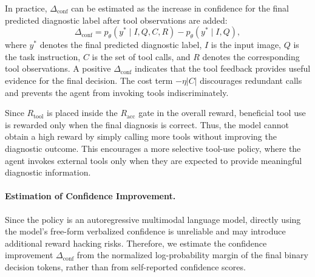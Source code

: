 \documentclass{article}
\begin{document}
{In practice, $\Delta_{\text{conf}}$ can be estimated as the increase in confidence for the final predicted diagnostic label after tool observations are added:
\begin{equation}
\Delta_{\text{conf}}
=
p_{\theta}(y^{*} \mid I, Q, C, R)
-
p_{\theta}(y^{*} \mid I, Q),
\end{equation}
where $y^{*}$ denotes the final predicted diagnostic label, $I$ is the input image, $Q$ is the task instruction, $C$ is the set of tool calls, and $R$ denotes the corresponding tool observations. 
A positive $\Delta_{\text{conf}}$ indicates that the tool feedback provides useful evidence for the final decision. 
The cost term $-\eta |C|$ discourages redundant calls and prevents the agent from invoking tools indiscriminately.

Since $R_{\text{tool}}$ is placed inside the $R_{\text{acc}}$ gate in the overall reward, beneficial tool use is rewarded only when the final diagnosis is correct. 
Thus, the model cannot obtain a high reward by simply calling more tools without improving the diagnostic outcome. 
This encourages a more selective tool-use policy, where the agent invokes external tools only when they are expected to provide meaningful diagnostic information.

\paragraph{Estimation of Confidence Improvement.}
Since the policy is an autoregressive multimodal language model, directly using the model's free-form verbalized confidence is unreliable and may introduce additional reward hacking risks. 
Therefore, we estimate the confidence improvement $\Delta_{\text{conf}}$ from the normalized log-probability margin of the final binary decision tokens, rather than from self-reported confidence scores.

}
\end{document}
